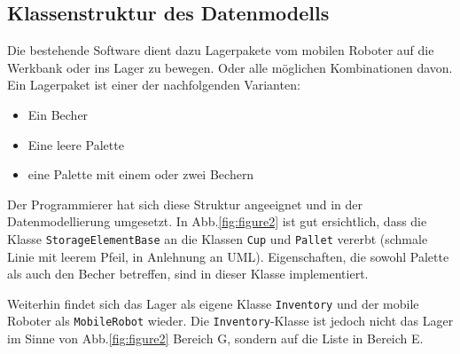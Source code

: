     \subsection{Klassenstruktur des Datenmodells}\label{Datenmodell}

    Die bestehende Software dient dazu Lagerpakete vom mobilen Roboter auf die Werkbank oder ins Lager zu bewegen.
    Oder alle möglichen Kombinationen davon. 
    Ein Lagerpaket ist einer der nachfolgenden Varianten:
    \begin{itemize}
        \item Ein Becher
        \item Eine leere Palette
        \item eine Palette mit einem oder zwei Bechern
    \end{itemize}
    
    Der Programmierer hat sich diese Struktur angeeignet und in der Datenmodellierung umgesetzt.
    In Abb.\ref{fig:figure2} ist gut ersichtlich, dass die Klasse \verb|StorageElementBase| an die Klassen \verb|Cup| und \verb|Pallet|
    vererbt (schmale Linie mit leerem Pfeil, in Anlehnung an UML). Eigenschaften, die sowohl Palette als auch den
    Becher betreffen, sind in dieser Klasse implementiert.

    Weiterhin findet sich das Lager als eigene Klasse \verb|Inventory| und der mobile Roboter als \verb|MobileRobot| wieder.
    Die \verb|Inventory|-Klasse ist jedoch nicht das Lager im Sinne von Abb.\ref{fig:figure2} Bereich \glqq G\grqq, sondern auf die Liste in
    Bereich \glqq E\grqq.\\


